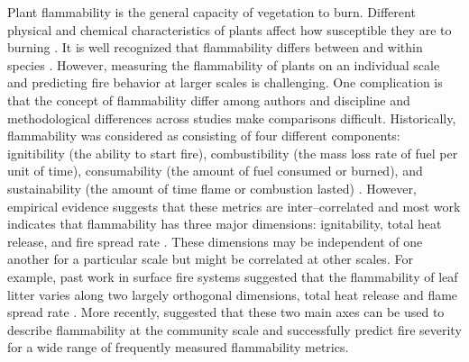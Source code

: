 \documentclass{bmcart}
\begin{document}
Plant flammability is the general capacity of vegetation to burn. Different physical and chemical characteristics of plants affect how susceptible they are to burning \citep{bond1996fire}. It is well recognized that flammability differs between and within species \citep{jaureguiberry2011device, pausas2012fire, calitz2015investigating, wyse2016quantitative, battersby2017exploring, cui2020shoot, zanzarini2022flammability, potts2022growth, cui2022intraspecific}. However, measuring the flammability of plants on an individual scale and predicting fire behavior at larger scales is challenging. One complication is that the concept of flammability differ among authors and discipline \citep{gill2005flammability} and methodological differences across studies make comparisons difficult. Historically, flammability was considered as consisting of four different components: ignitibility (the ability to start fire), combustibility (the mass loss rate of fuel per unit of time), consumability (the amount of fuel consumed or burned), and sustainability (the amount of time flame or combustion lasted) \citep{anderson1970forest, martin1993assessing}. However, empirical evidence suggests that these metrics are inter--correlated and most work indicates that flammability has three major dimensions: ignitability, total heat release, and fire spread rate \citep{pausas2017flammability}. These dimensions may be independent of one another for a particular scale but might be correlated at other scales. For example, past work in surface fire systems suggested that the flammability of leaf litter varies along two largely orthogonal dimensions, total heat release and flame spread rate \citep{scarff2006leaf, de2012leaf, cornwell2015flammability}. More recently, \citet{prior2018conceptualizing} suggested that these two main axes can be used to describe flammability at the community scale and successfully predict fire severity for a wide range of frequently measured flammability metrics.
\end{document}
